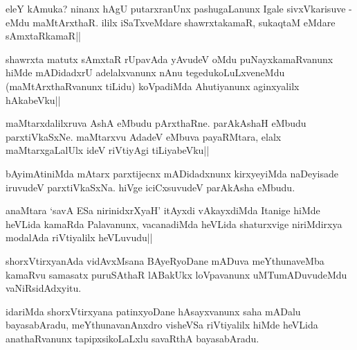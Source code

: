 
\begin{artha}
eleY kAmuka? ninanx hAgU putarxranUnx pashugaLanunx Igale 
sivxVkarisuve - eMdu maMtArxthaR. ililx iSaTxveMdare shawrxtakamaR, 
sukaqtaM eMdare sAmxtaRkamaR||
\end{artha}

\begin{artha}
shawrxta matutx sAmxtaR rUpavAda yAvudeV oMdu puNayxkamaRvanunx hiMde 
mADidadxrU adelalxvanunx nAnu tegedukoLuLxveneMdu (maMtArxthaRvanunx 
tiLidu) koVpadiMda Ahutiyanunx aginxyalilx hAkabeVku||
\end{artha}

\begin{artha}
maMtarxdalilxruva AshA eMbudu pArxthaRne. parAkAshaH eMbudu 
parxtiVkaSxNe. maMtarxvu AdadeV eMbuva payaRMtara, elalx 
maMtarxgaLalUlx ideV riVtiyAgi tiLiyabeVku||
\end{artha}


\begin{artha}
bAyimAtiniMda mAtarx parxtijecnx mADidadxnunx kirxyeyiMda naDeyisade 
iruvudeV parxtiVkaSxNa. hiVge iciCxsuvudeV parAkAsha eMbudu.
\end{artha}


\begin{artha}
anaMtara `savA ESa nirinidxrXyaH' itAyxdi vAkayxdiMda Itanige hiMde 
heVLida kamaRda Palavanunx, vacanadiMda heVLida shaturxvige 
niriMdirxya modalAda riVtiyalilx heVLuvudu||
\end{artha}


\begin{artha}
shorxVtirxyanAda vidAvxMsana BAyeRyoDane mADuva meYthunaveMba kamaRvu 
samasatx puruSAthaR lABakUkx loVpavanunx uMTumADuvudeMdu 
vaNiRsidAdxyitu.
\end{artha}

\begin{artha}
idariMda shorxVtirxyana patinxyoDane hAsayxvanunx saha mADalu 
bayasabAradu, meYthunavanAnxdro visheVSa riVtiyalilx hiMde heVLida 
anathaRvanunx tapipxsikoLaLxlu savaRthA bayasabAradu.
\end{artha}


